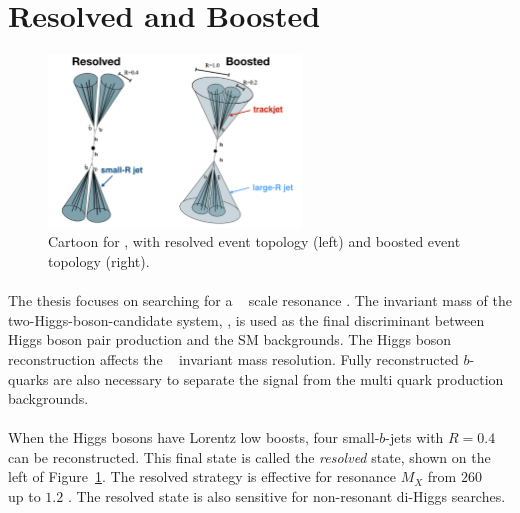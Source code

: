 \section{Resolved and Boosted}
\label{sec:res-boost}
\begin{figure}[htbp!]
  \centering
  \includegraphics[width=0.6\textwidth]{figures/theory/resolved_boosted}
  \caption{Cartoon for \Xtohhb, with resolved event topology (left) and boosted event topology (right).}
  \label{fig:resolved_bosted}
\end{figure}

\paragraph{}
The thesis focuses on searching for a \TeV~ scale resonance \Xtohhb. 
The invariant mass of the two-Higgs-boson-candidate system, \mtwoJ, is used as the final discriminant between Higgs boson pair production and the SM backgrounds.
The Higgs boson reconstruction affects the \mtwoJ~ invariant mass resolution.
Fully reconstructed $b$-quarks are also necessary to separate the signal from the multi quark production backgrounds.

\paragraph{}
When the Higgs bosons have Lorentz low boosts, four small-\R $b$-jets with $R=0.4$ can be reconstructed.
This final state is called the \textit{resolved} state, shown on the left of Figure~\ref{fig:resolved_bosted}.
The resolved strategy is effective for resonance $M_X$ from $260$ \GeV~ up to $1.2$ \TeV.
The resolved state is also sensitive for non-resonant di-Higgs searches.

